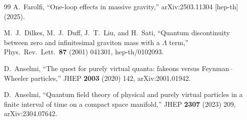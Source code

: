 \documentclass[11pt,a4paper]{article}
\theoremstyle{plain}
\theoremstyle{definition}
\begin{document}
\begin{thebibliography}{99}
  A.~Farolfi,
  ``One-loop effects in massive gravity,''
  arXiv:2503.11304 [hep-th] (2025).

  M.~J.~Dilkes, M.~J.~Duff, J.~T.~Liu, and H.~Sati,
  ``Quantum discontinuity between zero and infinitesimal
  graviton mass with a $\Lambda$ term,''
  Phys.\ Rev.\ Lett.\ \textbf{87} (2001) 041301,
  hep-th/0102093.

  D.~Anselmi,
  ``The quest for purely virtual quanta: fakeons versus
  Feynman--Wheeler particles,''
  JHEP \textbf{2003} (2020) 142,
  arXiv:2001.01942.

  D.~Anselmi,
  ``Quantum field theory of physical and purely virtual particles
  in a finite interval of time on a compact space manifold,''
  JHEP \textbf{2307} (2023) 209,
  arXiv:2304.07642.

\end{thebibliography}
\end{document}
